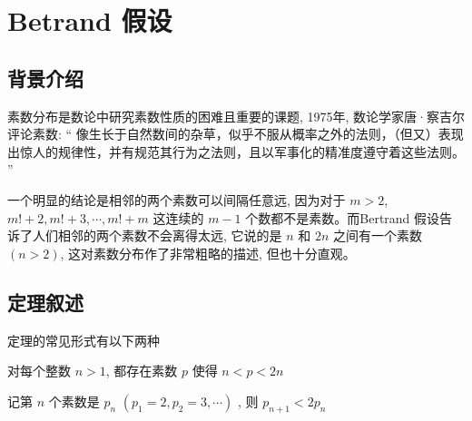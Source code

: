 \documentclass[main]{subfiles}
\begin{document}
\renewcommand{\filename}{Betrand 假设}%
\section{Betrand 假设}
\subsection{背景介绍}
素数分布是数论中研究素数性质的困难且重要的课题, 1975年, 数论学家唐·察吉尔评论素数: “ 像生长于自然数间的杂草，似乎不服从概率之外的法则，（但又）表现出惊人的规律性，并有规范其行为之法则，且以军事化的精准度遵守着这些法则。 ”
\par 一个明显的结论是相邻的两个素数可以间隔任意远, 因为对于 $m>2$,  $m!+2, m!+3, \cdots, m!+m$ 这连续的 $m-1$ 个数都不是素数。而Bertrand 假设告诉了人们相邻的两个素数不会离得太远, 它说的是 $n$ 和 $2n$ 之间有一个素数 $(n>2)$, 这对素数分布作了非常粗略的描述, 但也十分直观。
\subsection{定理叙述}
定理的常见形式有以下两种
\begin{theorem}[Betrand 假设]
对每个整数 $n > 1$, 都存在素数 $p$ 使得 $n < p <2n$
\end{theorem}
\begin{theorem}[另一种表述]
记第 $n$ 个素数是 $p_n$ $(p_1 = 2, p_2 = 3 , \cdots)$ , 则 $p_{n+1} < 2p_n$
\end{theorem}
\end{document}
